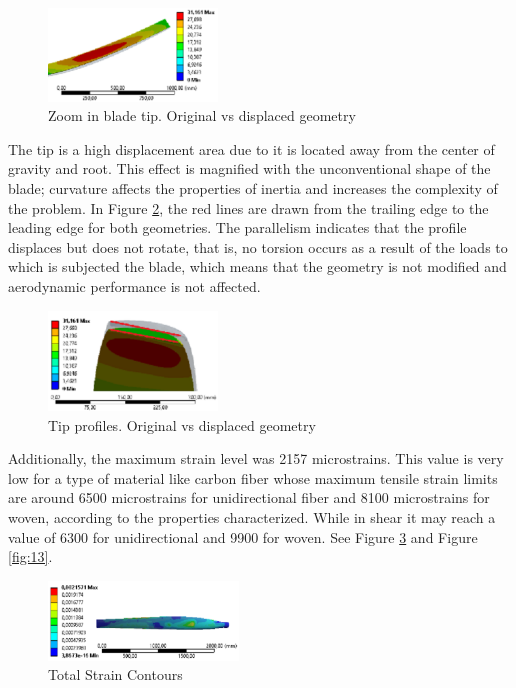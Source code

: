 \begin{figure}[H]
  \includegraphics[width=0.4\textwidth]{p3}
\caption{Zoom in blade tip. Original vs displaced geometry}
\label{fig:10}       %
\end{figure}
The tip is a high displacement area due to it is located away from the center of gravity and root. This effect is magnified with the unconventional shape of the blade; curvature affects the properties of inertia and increases the complexity of the problem. In Figure \ref{fig:11}, the red lines are drawn from the trailing edge to the leading edge for both geometries. The parallelism indicates that the profile displaces but does not rotate, that is, no torsion occurs as a result of the loads to which is subjected the blade, which means that the geometry is not modified and aerodynamic performance is not affected.
\vspace{-1.0cm}
\begin{figure}[H]
  \includegraphics[width=0.4\textwidth]{p4}
\caption{Tip profiles. Original vs displaced geometry}
\label{fig:11}       %
\end{figure}
Additionally, the maximum strain level was 2157 microstrains. This value is very low for a type of material like carbon fiber whose maximum tensile strain limits are around 6500 microstrains for unidirectional fiber and 8100 microstrains for woven, according to the properties characterized. While in shear it may reach a value of 6300 for unidirectional and 9900 for woven. See Figure \ref{fig:12} and Figure \ref{fig:13}.
\begin{figure}[H]
  \includegraphics[width=0.45\textwidth]{p5}
\caption{Total Strain Contours }
\label{fig:12}       %
\end{figure}


